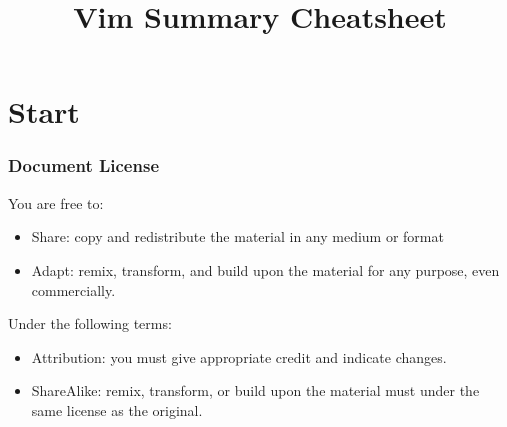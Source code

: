 \documentclass[table,dvipsnames]{beamer}
\title[Vim Cheatsheet]{Vim Summary Cheatsheet}
\author{}
\date{}
\begin{document}
    \section{Start}
    \begin{frame}
        \titlepage
    \end{frame}

    \begin{frame}
        \frametitle{Document License}
		\begin{exampleblock}{}
			\doclicenseThis
		\end{exampleblock}

		\begin{exampleblock}{}
			You are free to:
			\begin{itemize}
				\item Share: copy and redistribute the material in any medium or format
				\item Adapt: remix, transform, and build upon the material
				for any purpose, even commercially.
			\end{itemize}
		\end{exampleblock}

		\begin{exampleblock}{}
			Under the following terms:
			\begin{itemize}
				\item Attribution: you must give appropriate credit and indicate changes.
				\item ShareAlike: remix, transform, or build upon the material must under the same license as the original.
			\end{itemize}
		\end{exampleblock}
	\end{frame}
\end{document}
